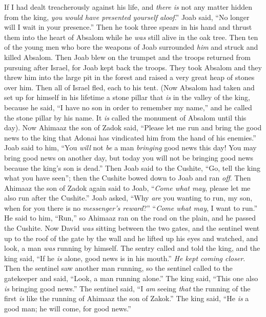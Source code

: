 \begin{biblechapter}
\verse If I had dealt treacherously against his life, and \textit{there is} not any matter hidden from the king, \textit{you would have presented yourself aloof}.”
\verse Joab said, “No longer will I wait in your presence.” Then he took three spears in his hand and thrust them into the heart of Absalom while he \textit{was} still alive in the oak tree.
\verse Then ten of the young men who bore the weapons of Joab surrounded \textit{him} and struck and killed Absalom.
\verse Then Joab blew on the trumpet and the troops returned from pursuing after Israel, for Joab kept back the troops.
\verse They took Absalom and they threw him into the large pit in the forest and raised a very great heap of stones over him. Then all of Israel fled, each to his tent.
\verse (Now Absalom had taken and set up for himself in his lifetime a stone pillar that \textit{is} in the valley of the king, because he said, “I have no son in order to remember my name,” and he called the stone pillar by his name. It \textit{is} called the monument of Absalom until this day).
\verse Now Ahimaaz the son of Zadok said, “Please let me run and bring the good news to the king that Adonai has vindicated him from the hand of his enemies.”
\verse Joab said to him, “You \textit{will} not \textit{be} a man \textit{bringing} good news this day! You may bring good news on another day, but today you will not be bringing good news because the king’s son is dead.”
\verse Then Joab said to the Cushite, “Go, tell the king what you have seen”; then the Cushite bowed down to Joab and ran \textit{off}.
\verse Then Ahimaaz the son of Zadok again said to Joab, “\textit{Come what may}, please let me also run after the Cushite.” Joab asked, “Why \textit{are} you wanting to run, my son, when for you there is no \textit{messenger’s reward}?”
\verse “\textit{Come what may}, I want to run.” He said to him, “Run,” so Ahimaaz ran on the road on the plain, and he passed the Cushite.
\verse Now David \textit{was} sitting between the two gates, and the sentinel went up to the roof of the gate by the wall and he lifted up his eyes and watched, and look, a man \textit{was} running by himself.
\verse The sentry called and told the king, and the king said, “If he \textit{is} alone, good news is in his mouth.” \textit{He kept coming closer}.
\verse Then the sentinel saw another man running, so the sentinel called to the gatekeeper and said, “Look, a man running alone.” The king said, “This one also \textit{is} bringing good news.”
\verse The sentinel said, “I \textit{am} seeing \textit{that} the running of the first \textit{is} like the running of Ahimaaz the son of Zakok.” The king said, “He \textit{is} a good man; he will come, for good news.”

\end{biblechapter}
